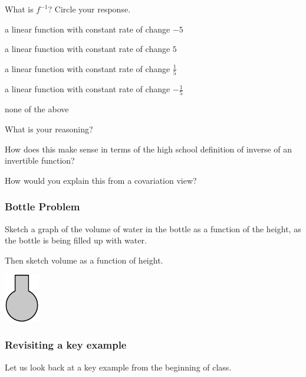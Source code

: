 \documentclass[11pt]{article}
\newcommand{\handout}{\subsubsection}
\theoremstyle{definition}
\begin{document}
\begin{enumerate}
What is $f^{-1}$? Circle your response. 
	\begin{center}
	a linear function with constant rate of change $-5$   
		
	a linear function with constant rate of change $5$  
	
	a linear function with constant rate of change $\frac{1}{5}$ 
	
	a linear function with constant rate of change $-\frac{1}{5}$ 
		
	none of the above
	\end{center}
What is your reasoning?

How does this make sense in terms of the high school definition of inverse of an invertible function?

How would you explain this from a covariation view? 

\end{enumerate}


\newpage
\handout{Bottle Problem}

\begin{minipage}{5in} \raggedright \parskip4pt
Sketch a graph of the volume of water in the bottle as a function of the height, as the bottle is being filled up with water. 

Then sketch volume as a function of height. 
\end{minipage}
\begin{minipage}{1.1in}
\begin{center}
    \includegraphics[width=0.6in]{4_Bottle}
\end{center}
\end{minipage}

\newpage
\handout{Revisiting a key example}


Let us look back at a key example from the beginning of class. 

\begin{center}
\end{center}
\end{document}
